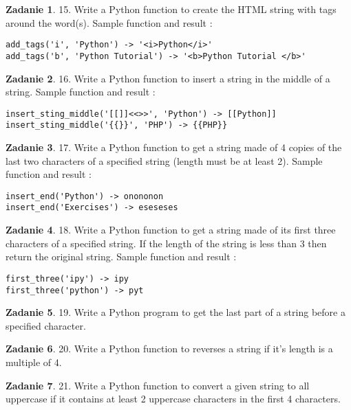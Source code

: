 \documentclass[11pt]{article}
\theoremstyle{definition}
\newtheorem{zadanie}{Zadanie}
\begin{document}
\begin{zadanie}
15. Write a Python function to create the HTML string with tags around the word(s).
Sample function and result :
\begin{verbatim}
add_tags('i', 'Python') -> '<i>Python</i>'
add_tags('b', 'Python Tutorial') -> '<b>Python Tutorial </b>'
\end{verbatim}
\end{zadanie}

\begin{zadanie}
16. Write a Python function to insert a string in the middle of a string.
Sample function and result :
\begin{verbatim}
insert_sting_middle('[[]]<<>>', 'Python') -> [[Python]]
insert_sting_middle('{{}}', 'PHP') -> {{PHP}}
\end{verbatim}
\end{zadanie}

\begin{zadanie}
17. Write a Python function to get a string made of 4 copies of the last two characters of a specified string (length must be at least 2).
Sample function and result :
\begin{verbatim}
insert_end('Python') -> onononon
insert_end('Exercises') -> eseseses
\end{verbatim}
\end{zadanie}

\begin{zadanie}
18. Write a Python function to get a string made of its first three characters of a specified string. If the length of the string is less than 3 then return the original string.
Sample function and result :
\begin{verbatim}
first_three('ipy') -> ipy
first_three('python') -> pyt
\end{verbatim}
\end{zadanie}

\begin{zadanie}
19. Write a Python program to get the last part of a string before a specified character.
\end{zadanie}

\begin{zadanie}
20. Write a Python function to reverses a string if it's length is a multiple of 4.
\end{zadanie}

\begin{zadanie}
21. Write a Python function to convert a given string to all uppercase if it contains at least 2 uppercase characters in the first 4 characters.
\end{zadanie}
\end{document}
